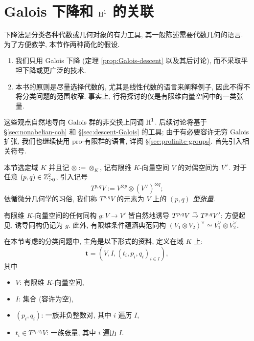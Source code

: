 \section{Galois 下降和 \texorpdfstring{$\operatorname{H}^1$}{H1} 的关联}\label{sec:Galois-H1}
下降法是分类各种代数或几何对象的有力工具, 其一般陈述需要代数几何的语言. 为了方便教学, 本节作两种简化的假设.
\begin{enumerate}
	\item 我们只用 Galois 下降 (定理 \ref{prop:Galois-descent} 以及其后讨论), 而不采取平坦下降或更广泛的技术.
	\item 本书的原则是尽量选择代数的, 尤其是线性代数的语言来阐释例子, 因此不得不将分类问题的范围收窄. 事实上, 行将探讨的仅是有限维向量空间中的一类张量.
\end{enumerate}

这些观点自然地导向 Galois 群的非交换上同调 $\operatorname{H}^1$. 后续讨论将基于 \S\ref{sec:nonabelian-coh} 和 \S\ref{sec:descent-Galois} 的工具; 由于有必要容许无穷 Galois 扩张, 我们也继续使用 pro-有限群的语言, 详阅 \S\ref{sec:profinite-groups}. 首先引入相关符号.

\begin{convention}
	本节选定域 $K$ 并且记 $\otimes := \otimes_K$, 记有限维 $K$-向量空间 $V$ 的对偶空间为 $V^\vee$. 对于任意 $(p, q) \in \mathbb{Z}_{\geq 0}^2$, 引入记号
	\[ T^{p, q} V := V^{\otimes p} \otimes (V^\vee)^{\otimes q}; \]
	依循微分几何学的习俗, 我们称 $T^{p, q} V$ 的元素为 $V$ 上的 \emph{$(p, q)$ 型张量}.
\end{convention}

有限维 $K$-向量空间的任何同构 $g: V \to V'$ 皆自然地诱导 $T^{p, q} V \stackrel{\sim}{\rightarrow} T^{p, q} V'$; 方便起见, 诱导同构仍记为 $g$. 此外, 有限维条件蕴涵典范同构 $(V_1 \otimes V_2)^\vee \simeq V_1^\vee \otimes V_2^\vee$.

在本节考虑的分类问题中, 主角是以下形式的资料, 定义在域 $K$ 上:
\begin{equation}\label{eqn:tensor-data}
	\mathbf{t} = (V, I, (t_i, p_i, q_i)_{i \in I}),
\end{equation}
其中
\begin{itemize}
	\item $V$: 有限维 $K$-向量空间,
	\item $I$: 集合 (容许为空),
	\item $(p_i, q_i)$: 一族非负整数对, 其中 $i$ 遍历 $I$,
	\item $t_i \in T^{p_i, q_i} V$: 一族张量, 其中 $i$ 遍历 $I$.
\end{itemize}

